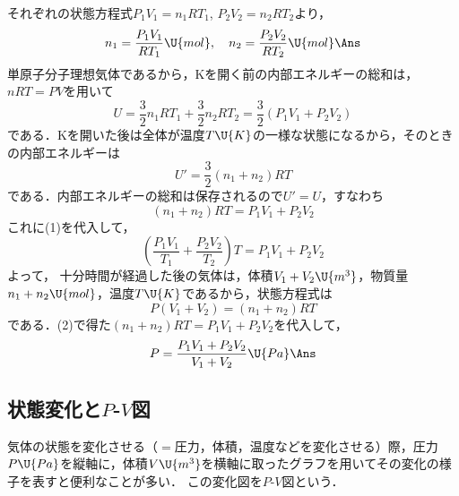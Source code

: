\begin{reidaiunit}
\begin{kaitou}
\begin{komon}
 それぞれの状態方程式$P_1V_1=n_1RT_1$, $P_2V_2=n_2RT_2$より，
       \[n_1=\frac{P_1V_1}{RT_1}\U{mol},\quad n_2=\frac{P_2V_2}{RT_2}\U{mol}\Ans\]
 単原子分子理想気体であるから，$\mathrm{K}$を開く前の内部エネルギーの総和は，$nRT=PV$を用いて
       \[U=\frac{3}{2}n_1RT_1+\frac{3}{2}n_2RT_2=\frac{3}{2}(P_1V_1+P_2V_2)\]
       である．$\mathrm{K}$を開いた後は全体が温度$T\U{K}$の一様な状態になるから，そのときの内部エネルギーは
       \[U'=\frac{3}{2}(n_1+n_2)RT\]
       である．内部エネルギーの総和は保存されるので$U'=U$，すなわち
       \[(n_1+n_2)RT=P_1V_1+P_2V_2\]
       これに(1)を代入して，
       \[\left(\frac{P_1V_1}{T_1}+\frac{P_2V_2}{T_2}\right)T=P_1V_1+P_2V_2\]
       よって，
 十分時間が経過した後の気体は，体積$V_1+V_2\U{m^3}$，物質量$n_1+n_2\U{mol}$，温度$T\U{K}$であるから，状態方程式は
       \[P(V_1+V_2)=(n_1+n_2)RT\]
       である．(2)で得た$(n_1+n_2)RT=P_1V_1+P_2V_2$を代入して，
       \[P=\frac{P_1V_1+P_2V_2}{V_1+V_2}\U{Pa}\Ans\]
\end{komon}
\end{kaitou}
\end{reidaiunit}

\subsection{状態変化と$P$-$V$図}

気体の状態を変化させる（$=$圧力，体積，温度などを変化させる）際，圧力$P\U{Pa}$を縦軸に，体積$V\U{m^3}$を横軸に取ったグラフを用いてその変化の様子を表すと便利なことが多い．
この変化図を$P$-$V$図という．

